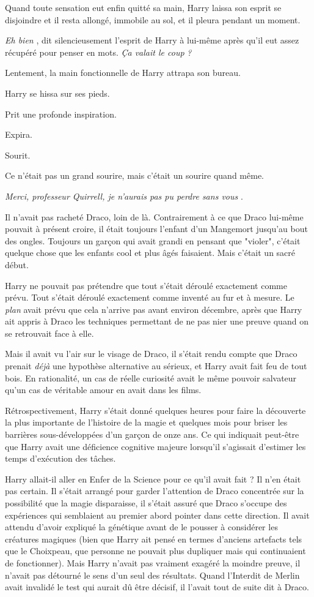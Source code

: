 Quand toute sensation eut enfin quitté sa main, Harry laissa son esprit se disjoindre et il resta allongé, immobile au sol, et il pleura pendant un moment.

\emph{Eh bien} , dit silencieusement l'esprit de Harry à lui-même après qu'il eut assez récupéré pour penser en mots. \emph{Ça valait le coup}  \emph{?} 

Lentement, la main fonctionnelle de Harry attrapa son bureau.

Harry se hissa sur ses pieds.

Prit une profonde inspiration.

Expira.

Sourit.

Ce n'était pas un grand sourire, mais c'était un sourire quand même.

\emph{Merci, professeur Quirrell, je n'aurais pas pu perdre sans vous} .

Il n'avait pas racheté Draco, loin de là. Contrairement à ce que Draco lui-même pouvait à présent croire, il était toujours l'enfant d'un Mangemort jusqu'au bout des ongles. Toujours un garçon qui avait grandi en pensant que "violer", c'était quelque chose que les enfants cool et plus âgés faisaient. Mais c'était un sacré début.

Harry ne pouvait pas prétendre que tout s'était déroulé exactement comme prévu. Tout s'était déroulé exactement comme inventé au fur et à mesure. Le \emph{plan}  avait prévu que cela n'arrive pas avant environ décembre, après que Harry ait appris à Draco les techniques permettant de ne pas nier une preuve quand on se retrouvait face à elle.

Mais il avait vu l'air sur le visage de Draco, il s'était rendu compte que Draco prenait \emph{déjà}  une hypothèse alternative au sérieux, et Harry avait fait feu de tout bois. En rationalité, un cas de réelle curiosité avait le même pouvoir salvateur qu'un cas de véritable amour en avait dans les films.

Rétrospectivement, Harry s'était donné quelques heures pour faire la découverte la plus importante de l'histoire de la magie et quelques mois pour briser les barrières sous-développées d'un garçon de onze ans. Ce qui indiquait peut-être que Harry avait une déficience cognitive majeure lorsqu'il s'agissait d'estimer les temps d'exécution des tâches.

Harry allait-il aller en Enfer de la Science pour ce qu'il avait fait ? Il n'en était pas certain. Il s'était arrangé pour garder l'attention de Draco concentrée sur la possibilité que la magie disparaisse, il s'était assuré que Draco s'occupe des expériences qui semblaient au premier abord pointer dans cette direction. Il avait attendu d'avoir expliqué la génétique avant de le pousser à considérer les créatures magiques (bien que Harry ait pensé en termes d'anciens artefacts tels que le Choixpeau, que personne ne pouvait plus dupliquer mais qui continuaient de fonctionner). Mais Harry n'avait pas vraiment exagéré la moindre preuve, il n'avait pas détourné le sens d'un seul des résultats. Quand l'Interdit de Merlin avait invalidé le test qui aurait dû être décisif, il l'avait tout de suite dit à Draco.

